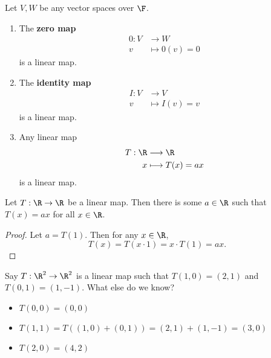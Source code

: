\documentclass[math0540-lecture-notes.tex]{subfiles}
\begin{document}
\begin{example}
  Let $V,W$ be any vector spaces over $\F$.
  \begin{enumerate}
    \item The \textbf{zero map}  \begin{align*}
        0: V &\longrightarrow W \\
        v &\longmapsto 0(v) = 0 
      \end{align*} is a linear map.

    \item The \textbf{identity map} \begin{align*}
        I: V &\longrightarrow V \\
        v &\longmapsto I(v) = v
      \end{align*} is a linear map. 

    \item Any linear map \begin{align*}
        T: \R &\longrightarrow \R \\
        x &\longmapsto T(x) = ax
      \end{align*} is a linear map.
  \end{enumerate}
\end{example}
\begin{proposition}{}
  Let $T:\R\to \R$ be a linear map. Then there is some $a\in \R$ such that $T(x)=ax$ for all  $x\in
  \R$.
\end{proposition}
\begin{proof}[Proof]
  Let $a=T(1)$. Then for any $x\in \R$, \[
    T(x) = T(x\cdot 1) = x\cdot T(1) = ax
  .\] 
\end{proof}

\begin{example}
  Say $T:\R^2\to \R^2$ is a linear map such that $T(1,0)=(2,1)$ and  $T(0,1)=(1,-1)$. What else do
  we know?
   \begin{itemize}
     \item $T(0,0)=(0,0)$
     \item  $T(1,1)=T((1,0)+(0,1))=(2,1)+(1,-1)=(3,0)$
     \item  $T(2,0)=(4,2)$
  \end{itemize}
\end{example}
\end{document}
